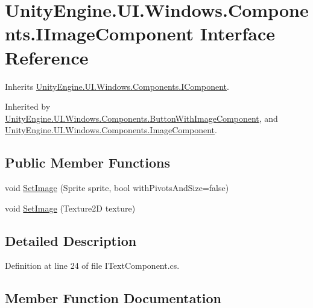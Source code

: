 \hypertarget{interface_unity_engine_1_1_u_i_1_1_windows_1_1_components_1_1_i_image_component}{}\section{Unity\+Engine.\+U\+I.\+Windows.\+Components.\+I\+Image\+Component Interface Reference}
\label{interface_unity_engine_1_1_u_i_1_1_windows_1_1_components_1_1_i_image_component}


Inherits \hyperlink{interface_unity_engine_1_1_u_i_1_1_windows_1_1_components_1_1_i_component}{Unity\+Engine.\+U\+I.\+Windows.\+Components.\+I\+Component}.



Inherited by \hyperlink{class_unity_engine_1_1_u_i_1_1_windows_1_1_components_1_1_button_with_image_component}{Unity\+Engine.\+U\+I.\+Windows.\+Components.\+Button\+With\+Image\+Component}, and \hyperlink{class_unity_engine_1_1_u_i_1_1_windows_1_1_components_1_1_image_component}{Unity\+Engine.\+U\+I.\+Windows.\+Components.\+Image\+Component}.

\subsection*{Public Member Functions}
\begin{DoxyCompactItemize}
\item 
void \hyperlink{interface_unity_engine_1_1_u_i_1_1_windows_1_1_components_1_1_i_image_component_adca0941365767184735f8886ccdddcb3}{Set\+Image} (Sprite sprite, bool with\+Pivots\+And\+Size=false)
\item 
void \hyperlink{interface_unity_engine_1_1_u_i_1_1_windows_1_1_components_1_1_i_image_component_a9414bd76592e7e11a18e5e9f2f059cea}{Set\+Image} (Texture2\+D texture)
\end{DoxyCompactItemize}


\subsection{Detailed Description}


Definition at line 24 of file I\+Text\+Component.\+cs.



\subsection{Member Function Documentation}
\hypertarget{interface_unity_engine_1_1_u_i_1_1_windows_1_1_components_1_1_i_image_component_adca0941365767184735f8886ccdddcb3}{}
